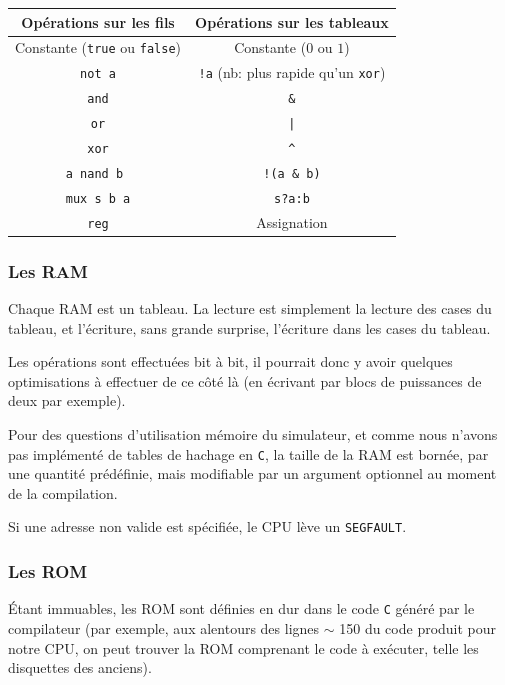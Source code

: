 \documentclass[10pt,a4paper,notitlepage ]{report}
\begin{document}
	\begin{center}
		
	\begin{tabular}{|c|c|}
		\hline
		Opérations sur les fils & Opérations sur les tableaux \\
		\hline
		Constante (\texttt{true} ou \texttt{false})& Constante ($0$ ou $1$)  \\
		\hline
		\texttt{not a}& \texttt{!a}  (nb: plus rapide qu'un \texttt{xor})\\
		\hline
		\texttt{and} & \texttt{\&}  \\
		\hline
		\texttt{or}& \texttt{|} \\
		\hline
		\texttt{xor}& \texttt{\^} \\
		\hline
		\texttt{a nand b }& \texttt{!(a \& b)} \\
		\hline
		\texttt{mux s b a}& \texttt{s?a:b} \\
		\hline
		\texttt{reg}&Assignation\\
		\hline
	\end{tabular}
	
	\end{center}

	\subsubsection{Les RAM}
	
	Chaque RAM est un tableau. La lecture est simplement la lecture des cases du tableau, et l'écriture, sans grande surprise, l'écriture dans les cases du tableau.
	
	Les opérations sont effectuées bit à bit, il pourrait donc y avoir quelques optimisations à effectuer de ce côté là (en écrivant par blocs de puissances de deux par exemple).
	
	Pour des questions d'utilisation mémoire du simulateur, et comme nous n'avons pas implémenté de tables de hachage en \texttt{C}, la taille de la RAM est bornée, par une quantité prédéfinie, mais modifiable par un argument optionnel au moment de la compilation.
	
	Si une adresse non valide est spécifiée, le CPU lève un \texttt{SEGFAULT}.
	
	\subsubsection{Les ROM}
	
	Étant immuables, les ROM sont définies en dur dans le code \texttt{C} généré par le compilateur (par exemple, aux alentours des lignes  $\sim$ 150 du code produit pour notre CPU, on peut trouver la ROM comprenant le code à exécuter, telle les disquettes des anciens).
	
\end{document}
